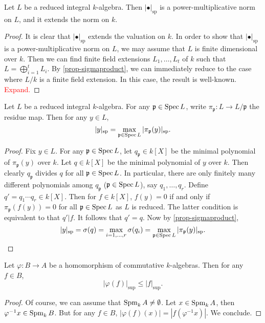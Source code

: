 \begin{proposition}
    Let $L$ be a reduced integral $k$-algebra. Then $|\bullet|_{\mathrm{sp}}$ is a power-multiplicative norm on $L$, and it extends the norm on $k$.
\end{proposition}
\begin{proof}
    It is clear that $|\bullet|_{\mathrm{sp}}$ extends the valuation on $k$. In order to show that $|\bullet|_{\mathrm{sp}}$ is a power-multiplicative norm on $L$, we may assume that $L$ is finite dimensional over $k$. Then we can find finite field extensions $L_1,\ldots,L_t$ of $k$ such that $L=\bigoplus_{i=1}^t L_i$. By \cref{prop-sigmaproduct}, we can immediately reduce to the case where $L/k$ is a finite field extension. In this case, the result is well-known. \textcolor{red}{Expand.}
\end{proof} 

\begin{proposition}\label{prop-spnormprimesred}
    Let $L$ be a reduced integral $k$-algebra. For any $\mathfrak{p}\in \operatorname{Spec} L$, write $\pi_{\mathfrak{p}}:L\rightarrow L/\mathfrak{p}$ the residue map. Then for any $y\in L$,
    \[
        |y|_{\mathrm{sp}}=\max_{\mathfrak{p}\in \operatorname{Spec} L}  |\pi_{\mathfrak{p}}(y)|_{\mathrm{sp}}.
    \]
\end{proposition}
\begin{proof}
    Fix $y\in L$.
    For any $\mathfrak{p}\in \operatorname{Spec} L$, let $q_{\mathfrak{p}}\in k[X]$ be the minimal polynomial of $\pi_{\mathfrak{p}}(y)$ over $k$. Let $q\in k[X]$ be the minimal polynomial of $y$ over $k$. Then clearly $q_{\mathfrak{p}}$ divides $q$ for all  $\mathfrak{p}\in \operatorname{Spec} L$. In particular, there are only finitely many different polynomials among $q_{\mathfrak{p}}$ ($\mathfrak{p}\in \operatorname{Spec} L$), say $q_1,\ldots,q_r$. Define $q'=q_1\cdots q_r\in k[X]$. Then for $f\in k[X]$, $f(y)=0$ if and only if $\pi_{\mathfrak{p}}(f(y))=0$ for all $\mathfrak{p}\in \operatorname{Spec} L$ as $L$ is reduced. The latter condition is equivalent to that $q'|f$. It follows that $q'=q$. Now by \cref{prop-sigmaproduct},
    \[
        |y|_{\mathrm{sp}}=\sigma(q)=\max_{i=1,\ldots,r}\sigma(q_i) =\max_{\mathfrak{p}\in \operatorname{Spec} L}  |\pi_{\mathfrak{p}}(y)|_{\mathrm{sp}}.
    \]
\end{proof}

\begin{proposition}\label{prop-supcontraction}
    Let $\varphi:B\rightarrow A$ be a homomorphism of commutative $k$-algebras. Then for any $f\in B$,
    \[
        |\varphi(f)|_{\sup}\leq |f|_{\sup}.  
    \]
\end{proposition}
\begin{proof}
    Of course, we can assume that $\operatorname{Spm}_k A\neq \emptyset$. Let $x\in \operatorname{Spm}_k A$, then $\varphi^{-1}x\in \operatorname{Spm}_k B$. But for any $f\in B$, $|\varphi(f)(x)|=|f(\varphi^{-1}x)|$. We conclude.
\end{proof}




